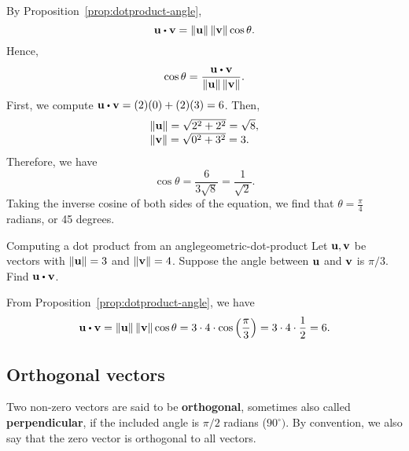 \begin{solution}
  By Proposition~\ref{prop:dotproduct-angle},
  \begin{equation*}
    \vect{u}\dotprod \vect{v}=\norm{\vect{u}} \norm{\vect{v}} \cos \theta.
  \end{equation*}
  Hence,
  \begin{equation*}
    \cos \theta =\frac{\vect{u}\dotprod \vect{v}}{\norm{\vect{u}}\norm{\vect{v}}}.
  \end{equation*}
  First, we compute $\vect{u}\dotprod \vect{v} = (2)(0) + (2)(3) = 6$.
  Then,
  \begin{equation*}
    \begin{array}{l}
      \left\|\mbox{\bf u}\right\| = \sqrt{2^2+2^2}=\sqrt{8},\\
      \left\|\mbox{\bf v}\right\| = \sqrt{0^2+3^2}=3.
    \end{array}
  \end{equation*}
  Therefore, we have
  \begin{equation*}
    \cos \theta =\frac{6}{3\sqrt{8}} = \frac{1}{\sqrt{2}}.
  \end{equation*}
  Taking the inverse cosine of both sides of the equation, we find
  that $\theta =\frac{\pi}{4}$ radians, or 45 degrees.
\end{solution}

\begin{example}{Computing a dot product from an angle}{geometric-dot-product}
  Let $\mbox{\bf u},\mbox{\bf v}$ be vectors with $ \left\|\mbox{\bf u}\right\| = 3$ and $\left\|\mbox{\bf v}\right\| = 4$.
  Suppose the angle between $\mbox{\bf u}$ and $\mbox{\bf v}$ is $\pi / 3$. Find $\vect{u}\dotprod \vect{v}$.
\end{example}

\begin{solution}
  From Proposition~\ref{prop:dotproduct-angle}, we have
  \begin{equation*}
    \vect{u}\dotprod \vect{v}
    =\norm{\vect{u}} \norm{\vect{v}} \cos \theta
    =3\cdot 4\cdot \cos\paren{\frac{\pi}{3}}
    =3\cdot 4\cdot \frac{1}{2}=6.
\end{equation*}
\end{solution}

\subsection{Orthogonal vectors}

Two non-zero vectors are said to be
\textbf{orthogonal},
sometimes also called
\textbf{perpendicular},
if the included angle is $\pi /2$ radians ($90^{\circ })$. By
convention, we also say that the zero vector is orthogonal to all
vectors.

